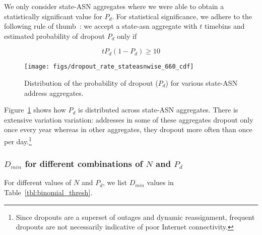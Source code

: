 We only consider state-ASN aggregates where we were able to obtain a
statistically significant value for $P_d$. For statistical
significance, we adhere to the following rule of
thumb~\cite[Chapter~6]{biostats-book}: we accept a state-asn aggregate with $t$ timebins
and estimated probability of dropout $P_d$ only if 

\begin{equation}
	tP_d(1-P_d) \geq 10
	\label{eq:stat_sig}
\end{equation}


\begin{figure}[t]
\centering
\texttt{[image: figs/dropout\_rate\_stateasnwise\_660\_cdf]}
\caption{
\label{fig:p_dropout}
Distribution of the probability of dropout ($P_d$) for various state-ASN address aggregates.}
\end{figure}

Figure~\ref{fig:p_dropout} shows how $P_d$ is distributed across
state-ASN aggregates. There is extensive variation
variation: addresses in some of these aggregates dropout only once every
year whereas in other aggregates, they dropout more often than once per
day.\footnote{Since dropouts are a superset of outages and dynamic
  reassignment, frequent dropouts are not necessarily indicative of
  poor Internet connectivity.} %


\subsubsection*{$D_{min}$ for different combinations of $N$ and $P_d$}

For different values of $N$ and $P_d$, we list $D_{min}$ values in
Table~\ref{tbl:binomial_thresh}. 

